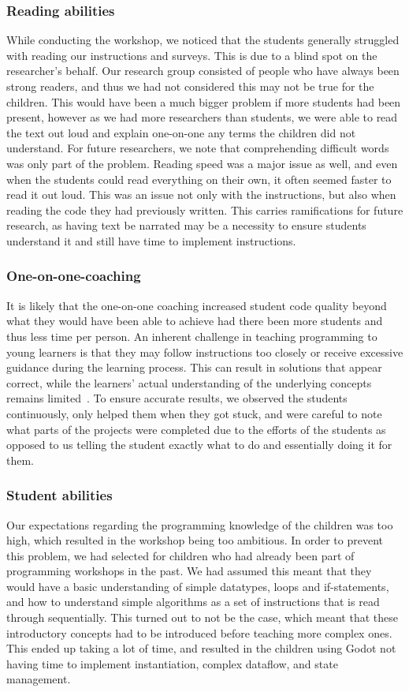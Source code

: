 \subsubsection{Reading abilities}
While conducting the workshop, we noticed that the students generally struggled with reading our instructions and surveys.
This is due to a blind spot on the researcher's behalf.
Our research group consisted of people who have always been strong readers, and thus we had not considered this may not be true for the children.
This would have been a much bigger problem if more students had been present, however as we had more researchers than students, we were able to read the text out loud and explain one-on-one any terms the children did not understand.
For future researchers, we note that comprehending difficult words was only part of the problem.
Reading speed was a major issue as well, and even when the students could read everything on their own, it often seemed faster to read it out loud.
This was an issue not only with the instructions, but also when reading the code they had previously written.
This carries ramifications for future research, as having text be narrated may be a necessity to ensure students understand it and still have time to implement instructions.

\subsubsection{One-on-one-coaching}
It is likely that the one-on-one coaching increased student code quality beyond what they would have been able to achieve had there been more students and thus less time per person.
An inherent challenge in teaching programming to young learners is that they may follow instructions too closely or receive excessive guidance during the learning process.
This can result in solutions that appear correct, while the learners' actual understanding of the underlying concepts remains limited~\cite{grover_assessing_2014}.
To ensure accurate results, we observed the students continuously, only helped them when they got stuck, and were careful to note what parts of the projects were completed due to the efforts of the students as opposed to us telling the student exactly what to do and essentially doing it for them.

\subsubsection{Student abilities}
Our expectations regarding the programming knowledge of the children was too high, which resulted in the workshop being too ambitious.
In order to prevent this problem, we had selected for children who had already been part of programming workshops in the past.
We had assumed this meant that they would have a basic understanding of simple datatypes, loops and if-statements, and how to understand simple algorithms as a set of instructions that is read through sequentially.
This turned out to not be the case, which meant that these introductory concepts had to be introduced before teaching more complex ones.
This ended up taking a lot of time, and resulted in the children using Godot not having time to implement instantiation, complex dataflow, and state management.

